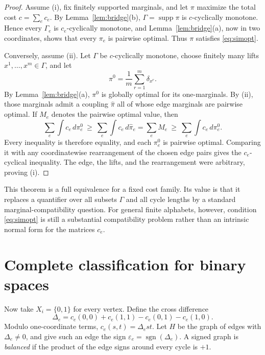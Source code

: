 \documentclass[11pt]{article}
\newcommand{\1}{\mathbf 1}
\begin{document}
\begin{proof}
Assume (i), fix finitely supported marginals, and let $\pi$ maximize the
total cost $c=\sum_e c_e$.  By Lemma~\ref{lem:bridge}(b),
$\Gamma=\operatorname{supp}\pi$ is $c$-cyclically monotone.  Hence every
$\Gamma_e$ is $c_e$-cyclically monotone, and
Lemma~\ref{lem:bridge}(a), now in two coordinates, shows that every
$\pi_e$ is pairwise optimal.  Thus $\pi$ satisfies \eqref{eq:simopt}.

Conversely, assume (ii).  Let $\Gamma$ be $c$-cyclically monotone, choose
finitely many lifts $x^1,\ldots,x^m\in\Gamma$, and let
\[
 \pi^0=\frac1m\sum_{r=1}^m\delta_{x^r}.
\]
By Lemma~\ref{lem:bridge}(a), $\pi^0$ is globally optimal for its
one-marginals.  By (ii), those marginals admit a coupling $\widehat\pi$ all
of whose edge marginals are pairwise optimal.  If $M_e$ denotes the
pairwise optimal value, then
\[
 \sum_e\int c_e\,d\pi^0_e
 \ \geq\ \sum_e\int c_e\,d\widehat\pi_e
 =\sum_eM_e
 \ \geq\ \sum_e\int c_e\,d\pi^0_e.
\]
Every inequality is therefore equality, and each $\pi^0_e$ is pairwise
optimal.  Comparing it with any coordinatewise rearrangement of the chosen
edge pairs gives the $c_e$-cyclical inequality.  The edge, the lifts, and
the rearrangement were arbitrary, proving (i).
\end{proof}

This theorem is a full equivalence for a fixed cost family.  Its value is
that it replaces a quantifier over all subsets $\Gamma$ and all cycle
lengths by a standard marginal-compatibility question.  For general
finite alphabets, however, condition \eqref{eq:simopt} is still a substantial
compatibility problem rather than an intrinsic normal form for the matrices
$c_e$.

\section{Complete classification for binary spaces}

Now take $X_i=\{0,1\}$ for every vertex.  Define the cross difference
\begin{equation}\label{eq:crossdifference}
 \Delta_e=c_e(0,0)+c_e(1,1)-c_e(0,1)-c_e(1,0).
\end{equation}
Modulo one-coordinate terms, $c_e(s,t)=\Delta_e st$.  Let $H$ be the graph
of edges with $\Delta_e\ne0$, and give such an edge the sign
$\varepsilon_e=\operatorname{sgn}(\Delta_e)$.  A signed graph is
\emph{balanced} if the product of the edge signs around every cycle is
$+1$.
\end{document}
